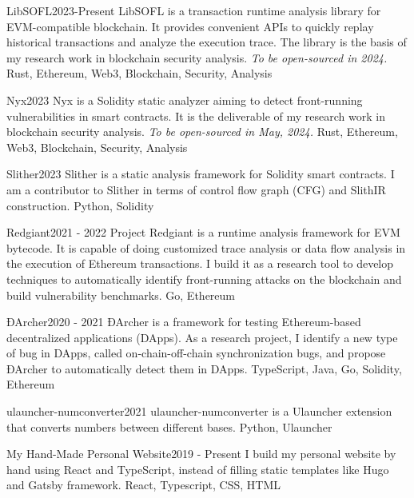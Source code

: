 \documentclass[localFont,alternative]{documentMETADATA}
\begin{document}
\begin{projects}
	\project
	{LibSOFL}{2023-Present}
	{LibSOFL is a transaction runtime analysis library for EVM-compatible blockchain. It provides convenient APIs to quickly replay historical transactions and analyze the execution trace. The library is the basis of my research work in blockchain security analysis.}
	{\textit{To be open-sourced in 2024.}}
	{Rust, Ethereum, Web3, Blockchain, Security, Analysis}

	\project
	{Nyx}{2023}
	{Nyx is a Solidity static analyzer aiming to detect front-running vulnerabilities in smart contracts. It is the deliverable of my research work in blockchain security analysis.}
	{\textit{To be open-sourced in May, 2024.}}
	{Rust, Ethereum, Web3, Blockchain, Security, Analysis}


	\project
	{Slither}{2023}
	{}
	{Slither is a static analysis framework for Solidity smart contracts. I am a contributor to Slither in terms of control flow graph (CFG) and SlithIR construction.}
	{Python, Solidity}

	\project
	{Redgiant}{2021 - 2022}
	{}
	{Project Redgiant is a runtime analysis framework for EVM bytecode. It is capable of doing customized trace analysis or data flow analysis in the execution of Ethereum transactions. I build it as a research tool to develop techniques to automatically identify front-running attacks on the blockchain and build vulnerability benchmarks.}
	{Go, Ethereum}

	\project
	{ĐArcher}{2020 - 2021}
	{}
	{ĐArcher is a framework for testing Ethereum-based decentralized applications (DApps). As a research project, I identify a new type of bug in DApps, called on-chain-off-chain synchronization bugs, and propose ĐArcher to automatically detect them in DApps.}
	{TypeScript, Java, Go, Solidity, Ethereum}

	\project
	{ulauncher-numconverter}{2021}
	{}
	{ulauncher-numconverter is a Ulauncher extension that converts numbers between different bases.}
	{Python, Ulauncher}


	\project
	{My Hand-Made Personal Website}{2019 - Present}
	{}
	{I build my personal website by hand using React and TypeScript, instead of filling static templates like Hugo and Gatsby framework.}
	{React, Typescript, CSS, HTML}

\end{projects}
\end{document}
